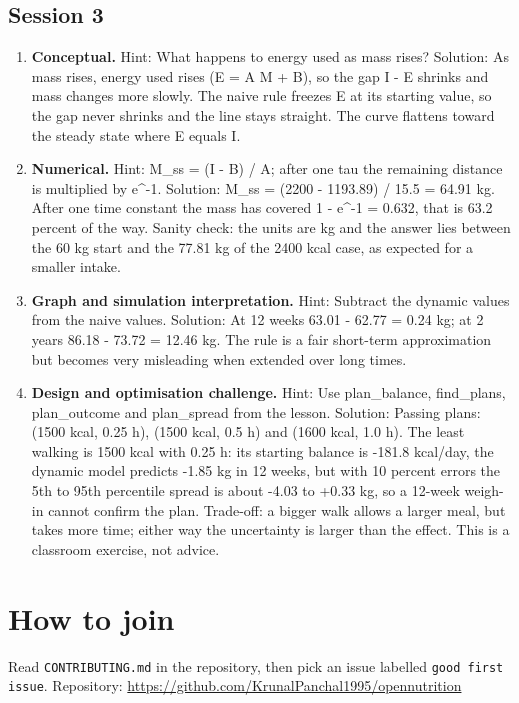 \documentclass[11pt,a4paper]{article}
\begin{document}
\subsection*{Session 3}
\begin{enumerate}[nosep]
\item \textbf{Conceptual.} Hint: What happens to energy used as mass rises? Solution: As mass rises, energy used rises (E = A M + B), so the gap I - E shrinks and mass changes more slowly. The naive rule freezes E at its starting value, so the gap never shrinks and the line stays straight. The curve flattens toward the steady state where E equals I.
\item \textbf{Numerical.} Hint: M\_ss = (I - B) / A; after one tau the remaining distance is multiplied by e\textasciicircum{}-1. Solution: M\_ss = (2200 - 1193.89) / 15.5 = 64.91 kg. After one time constant the mass has covered 1 - e\textasciicircum{}-1 = 0.632, that is 63.2 percent of the way. Sanity check: the units are kg and the answer lies between the 60 kg start and the 77.81 kg of the 2400 kcal case, as expected for a smaller intake.
\item \textbf{Graph and simulation interpretation.} Hint: Subtract the dynamic values from the naive values. Solution: At 12 weeks 63.01 - 62.77 = 0.24 kg; at 2 years 86.18 - 73.72 = 12.46 kg. The rule is a fair short-term approximation but becomes very misleading when extended over long times.
\item \textbf{Design and optimisation challenge.} Hint: Use plan\_balance, find\_plans, plan\_outcome and plan\_spread from the lesson. Solution: Passing plans: (1500 kcal, 0.25 h), (1500 kcal, 0.5 h) and (1600 kcal, 1.0 h). The least walking is 1500 kcal with 0.25 h: its starting balance is -181.8 kcal/day, the dynamic model predicts -1.85 kg in 12 weeks, but with 10 percent errors the 5th to 95th percentile spread is about -4.03 to +0.33 kg, so a 12-week weigh-in cannot confirm the plan. Trade-off: a bigger walk allows a larger meal, but takes more time; either way the uncertainty is larger than the effect. This is a classroom exercise, not advice.
\end{enumerate}

\section{How to join}
Read \texttt{CONTRIBUTING.md} in the repository, then pick an issue labelled \texttt{good first issue}. Repository: \url{https://github.com/KrunalPanchal1995/opennutrition}
\end{document}
